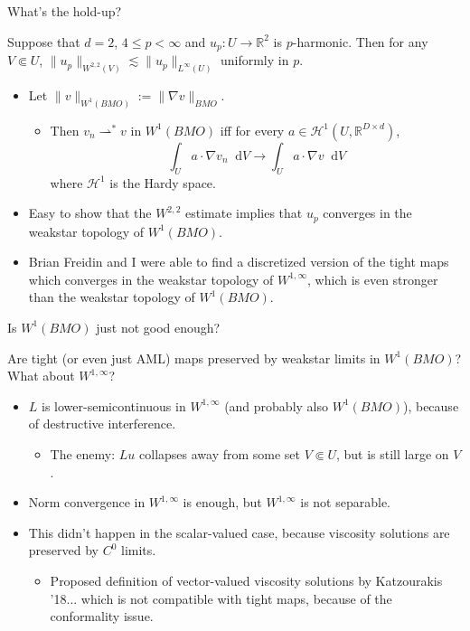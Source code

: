 \documentclass[10pt]{beamer}
\newcommand{\RR}{\mathbb{R}}
\newcommand*\dif{\mathop{}\!\mathrm{d}}
\begin{document}
\begin{frame}{What's the hold-up?}
\begin{theorem} 
Suppose that $d = 2$, $4 \leq p < \infty$ and $u_p: U \to \RR^2$ is $p$-harmonic.
Then for any $V \Subset U$, $\|u_p\|_{W^{2, 2}(V)} \lesssim \|u_p\|_{L^\infty(U)}$ uniformly in $p$. \pause
\end{theorem}

\begin{itemize}
\item Let $\|v\|_{W^1(BMO)} := \|\nabla v\|_{BMO}$.
\begin{itemize}
\item Then $v_n \rightharpoonup^* v$ in $W^1(BMO)$ iff for every $a \in \mathcal H^1(U, \RR^{D \times d})$,
$$\int_U a \cdot \nabla v_n \dif V \to \int_U a \cdot \nabla v \dif V$$
where $\mathcal H^1$ is the Hardy space. \pause
\end{itemize}
\item Easy to show that the $W^{2, 2}$ estimate implies that $u_p$ converges in the weakstar topology of $W^1(BMO)$. \pause
\item Brian Freidin and I were able to find a discretized version of the tight maps which converges in the weakstar topology of $W^{1, \infty}$, which is even stronger than the weakstar topology of $W^1(BMO)$.
\end{itemize}

\end{frame}

\begin{frame}{Is $W^1(BMO)$ just not good enough?}
\begin{problem}
    Are tight (or even just AML) maps preserved by weakstar limits in $W^1(BMO)$? What about $W^{1, \infty}$? \pause
\end{problem}

\begin{itemize}
\item $L$ is lower-semicontinuous in $W^{1, \infty}$ (and probably also $W^1(BMO)$), because of destructive interference.
\begin{itemize}
\item The enemy: $Lu$ collapses away from some set $V \Subset U$, but is still large on $V$. \pause
\end{itemize}
\item Norm convergence in $W^{1, \infty}$ is enough, but $W^{1, \infty}$ is not separable. \pause
\item This didn't happen in the scalar-valued case, because viscosity solutions are preserved by $C^0$ limits.
\begin{itemize}
\item Proposed definition of vector-valued viscosity solutions by Katzourakis '18... which is not compatible with tight maps, because of the conformality issue.
\end{itemize}
\end{itemize}
\end{frame}
\end{document}
